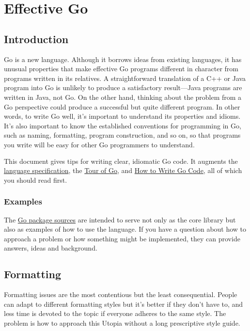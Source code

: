 \chapter*{Effective Go}
\section*{Introduction}

Go is a new language. Although it borrows ideas from existing languages,
it has unusual properties that make effective Go programs different in
character from programs written in its relatives. A straightforward
translation of a C++ or Java program into Go is unlikely to produce a
satisfactory result---Java programs are written in Java, not Go. On the
other hand, thinking about the problem from a Go perspective could
produce a successful but quite different program. In other words, to
write Go well, it's important to understand its properties and idioms.
It's also important to know the established conventions for programming
in Go, such as naming, formatting, program construction, and so on, so
that programs you write will be easy for other Go programmers to
understand.

This document gives tips for writing clear, idiomatic Go code. It
augments the \href{/ref/spec}{language specification}, the
\href{http://tour.golang.org/}{Tour of Go}, and
\href{/doc/code.html}{How to Write Go Code}, all of which you should
read first.

\subsection*{Examples}

The \href{/src/pkg/}{Go package sources} are intended to serve not only
as the core library but also as examples of how to use the language. If
you have a question about how to approach a problem or how something
might be implemented, they can provide answers, ideas and background.

\section*{Formatting}

Formatting issues are the most contentious but the least consequential.
People can adapt to different formatting styles but it's better if they
don't have to, and less time is devoted to the topic if everyone adheres
to the same style. The problem is how to approach this Utopia without a
long prescriptive style guide.

